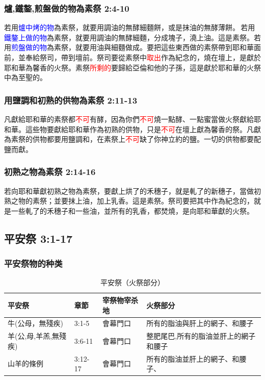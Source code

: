 \subsubsection{爐,鐵鏊,煎盤做的物為素祭 2:4-10}
若用\textcolor{blue}{爐中烤的物}為素祭，就要用調油的無酵細麵餅，或是抹油的無酵薄餅。 若用\textcolor{blue}{鐵鏊上做的物}為素祭，就要用調油的無酵細麵，分成塊子，澆上油。這是素祭。若用\textcolor{blue}{煎盤做的物}為素祭，就要用油與細麵做成。要把這些東西做的素祭帶到耶和華面前，並奉給祭司，帶到壇前。祭司要從素祭中\textcolor{red}{取出}作為紀念的，燒在壇上，是獻於耶和華為馨香的火祭。素祭\textcolor{red}{所剩的}要歸給亞倫和他的子孫，這是獻於耶和華的火祭中為至聖的。

\subsubsection{用鹽調和初熟的供物為素祭 2:11-13}
凡獻給耶和華的素祭都\textcolor{red}{不可}有酵，因為你們\textcolor{red}{不可}燒一點酵、一點蜜當做火祭獻給耶和華。這些物要獻給耶和華作為初熟的供物，只是\textcolor{red}{不可}在壇上獻為馨香的祭。凡獻為素祭的供物都要用鹽調和，在素祭上\textcolor{red}{不可}缺了你神立約的鹽。一切的供物都要配鹽而獻。

\subsubsection{初熟之物為素祭 2:14-16}
若向耶和華獻初熟之物為素祭，要獻上烘了的禾穗子，就是軋了的新穗子，當做初熟之物的素祭；並要抹上油，加上乳香。這是素祭。祭司要把其中作為紀念的，就是一些軋了的禾穗子和一些油，並所有的乳香，都焚燒，是向耶和華獻的火祭。

\subsection{平安祭 3:1-17}
\subsubsection{平安祭物的种类}
\begin{table}[H]%
\centering
\vspace*{-2mm}
\begin{tabular}{l|l|l|l}\hline
    平安祭 & 章節&宰祭物宰杀地& 火祭部分   \\ \hline
牛(公母，無殘疾) &3:1-5&會幕門口&所有的脂油與肝上的網子、和腰子\\\hline
 羊(公,母,羊羔,無殘疾)&3:6-11&會幕門口&整肥尾巴,所有的脂油並肝上的網子和腰子\\\hline
   山羊的條例& 3:12-17&會幕門口&所有的脂油並肝上的網子、和腰子、\\\hline
\end{tabular}
\caption{平安祭（火祭部分）}
\end{table}

